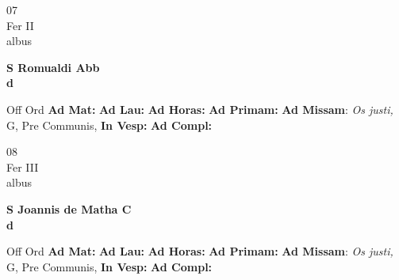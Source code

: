\documentclass[10pt, openany]{book}
\begin{document}
    \begin{center}
        \begin{minipage}{3.5in}
            \vspace{2em}
            \begin{minipage}{0.5in}
                {\Huge 07} \\
                {\normalsize Fer II} \\
                {\normalsize albus}
            \end{minipage}
            \begin{minipage}{3.0in}
                \textbf{ \large S Romualdi Abb \\
                \textnormal{\normalsize d}} \\ 
            \end{minipage}
            \begin{justify}Off Ord
                \textbf{Ad Mat: }
                \textbf{Ad Lau: }
                \textbf{Ad Horas: }
                \textbf{Ad Primam: }\textbf{Ad Missam}: \textit{Os justi,} G, Pre Communis,  
                \textbf{In Vesp: }
                \textbf{Ad Compl: }
            \end{justify}
        \end{minipage}
    \end{center}

    \begin{center}
        \begin{minipage}{3.5in}
            \vspace{2em}
            \begin{minipage}{0.5in}
                {\Huge 08} \\
                {\normalsize Fer III} \\
                {\normalsize albus}
            \end{minipage}
            \begin{minipage}{3.0in}
                \textbf{ \large S Joannis de Matha C \\
                \textnormal{\normalsize d}} \\ 
            \end{minipage}
            \begin{justify}Off Ord
                \textbf{Ad Mat: }
                \textbf{Ad Lau: }
                \textbf{Ad Horas: }
                \textbf{Ad Primam: }\textbf{Ad Missam}: \textit{Os justi,} G, Pre Communis,  
                \textbf{In Vesp: }
                \textbf{Ad Compl: }
            \end{justify}
        \end{minipage}
    \end{center}
\end{document}
